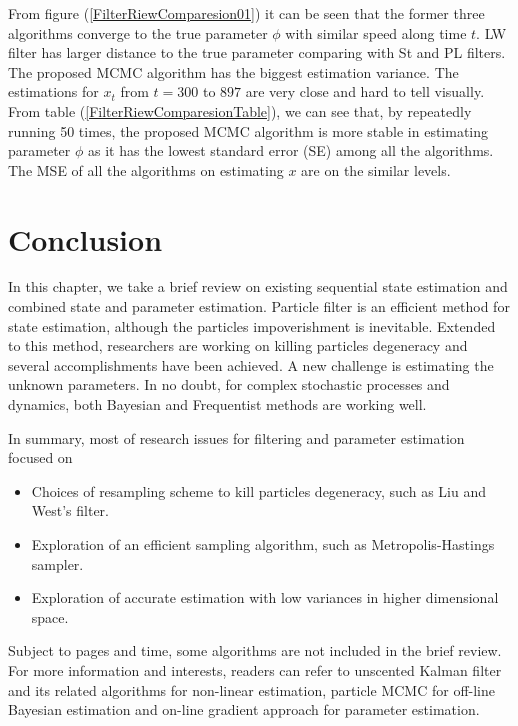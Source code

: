 From figure (\ref{FilterRiewComparesion01}) it can be seen that the former three algorithms converge to the true parameter $\phi$ with similar speed along time $t$. LW filter has larger distance to the true parameter comparing with St and PL filters. The proposed MCMC algorithm has the biggest estimation variance. The estimations for $x_t$ from $t=300$ to $897$ are very close and hard to tell visually. From table (\ref{FilterRiewComparesionTable}), we can see that, by repeatedly running 50 times, the proposed MCMC algorithm is more stable in estimating parameter $\phi$ as it has the lowest standard error (SE) among all the algorithms. The MSE of all the algorithms on estimating $x$ are on the similar levels. 


\section{Conclusion}

In this chapter, we take a brief review on existing sequential state estimation and combined state and parameter estimation. Particle filter is an efficient method for state estimation, although the particles impoverishment is inevitable. Extended to this method, researchers are working on killing particles degeneracy and several accomplishments have been achieved. A new challenge is estimating the unknown parameters. In no doubt, for complex stochastic processes and dynamics, both  Bayesian and Frequentist methods are working well. 

In summary, most of research issues for filtering and parameter estimation focused on 
\begin{itemize}
\item Choices of resampling scheme to kill particles degeneracy, such as Liu and West's filter.
\item Exploration of an efficient sampling algorithm, such as Metropolis-Hastings sampler. 
\item Exploration of accurate estimation with low variances in higher dimensional space. 
\end{itemize}

Subject to pages and time, some algorithms are not included in the brief review. For more information and interests, readers can refer to unscented Kalman filter \cite{wan2000unscented} and its related algorithms for non-linear estimation, particle MCMC \cite{andrieu2010particle} for off-line Bayesian estimation and on-line gradient approach \cite{poyiadjis2005maximum} for parameter estimation. 



